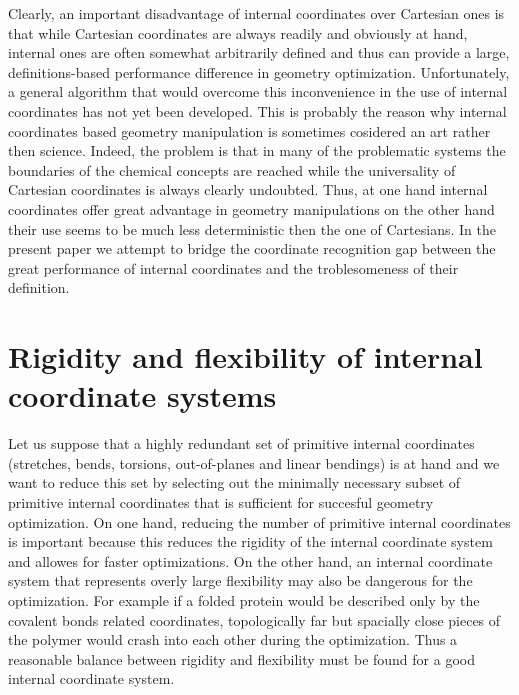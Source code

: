 \documentclass[prl,aps,preprint,superbib,12pt]{revtex4}
\begin{document}
Clearly, an important disadvantage of internal coordinates 
over Cartesian ones
is that while Cartesian coordinates are always readily and
obviously at hand,
internal ones are often somewhat arbitrarily defined and thus
can provide a large, definitions-based performance difference
in geometry optimization. 
Unfortunately,
a general algorithm that would overcome this inconvenience in the use
of internal coordinates has not yet been developed. This is probably
the reason why internal coordinates based geometry manipulation
is sometimes cosidered an art rather then science.
Indeed, the problem is that in many of the
problematic systems the boundaries of the chemical concepts are 
reached while the universality of Cartesian coordinates is always 
clearly undoubted. Thus, at one hand internal coordinates offer
great advantage in geometry manipulations on the other hand their
use seems to be much less deterministic then the one of Cartesians.
In the present paper we attempt to bridge the coordinate recognition
gap between the great performance of internal coordinates and the 
troblesomeness of their definition.

\section{Rigidity and flexibility of internal coordinate systems}
Let us suppose that a highly redundant set of primitive
internal coordinates (stretches, bends, torsions, out-of-planes
and linear bendings) is
at hand and we want to reduce this set 
by selecting out the minimally necessary subset of 
primitive internal coordinates that is sufficient for succesful
geometry optimization.
On one hand, reducing the number of primitive internal coordinates
is important because this reduces the rigidity of the internal 
coordinate system and allowes for faster optimizations.
On the other hand, an internal coordinate system that represents
overly large flexibility may also be dangerous for the optimization.
For example if a folded protein would be described only by the covalent
bonds related coordinates, topologically far but spacially close
pieces of the polymer would crash into each other during the 
optimization. Thus a reasonable balance between rigidity and
flexibility must be found for a good internal coordinate system.
\end{document}
